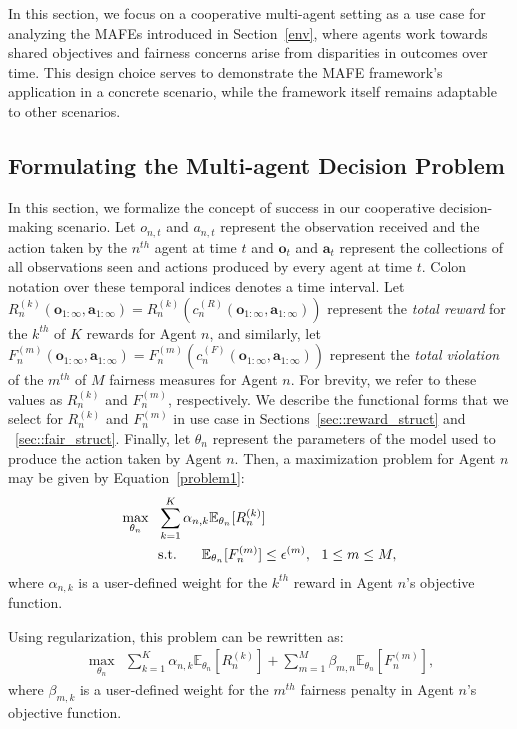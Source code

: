 \label{Fair_Sec}

In this section, we focus on a cooperative multi-agent setting as a use case for analyzing the MAFEs introduced in Section~\ref{env}, where agents work towards shared objectives and fairness concerns arise from disparities in outcomes over time. This design choice serves to demonstrate the MAFE framework’s application in a concrete scenario, while the framework itself remains adaptable to other scenarios.

\subsection{Formulating the Multi-agent Decision Problem}
In this section, we formalize the concept of success in our cooperative decision-making scenario. Let $o_{n,t}$ and $a_{n,t}$ represent the observation received and the action taken by the $n^{th}$ agent at time $t$ and $\mathbf{o}_{t}$ and $\mathbf{a}_{t}$ represent the collections of all observations seen and actions produced by every agent at time $t$. Colon notation over these temporal indices denotes a time interval. Let $R_n^{(k)}(\mathbf{o}_{1:\infty},\mathbf{a}_{1:\infty})=R^{(k)}_n(c_n^{(R)}(\mathbf{o}_{1:\infty},\mathbf{a}_{1:\infty}))$ represent the \textit{total reward} for the $k^{th}$ of $K$ rewards for Agent $n$, and similarly, let $F_n^{(m)}(\mathbf{o}_{1:\infty},\mathbf{a}_{1:\infty})=F_n^{(m)}(c_n^{(F)}(\mathbf{o}_{1:\infty},\mathbf{a}_{1:\infty}))$ represent the \textit{total violation} of the $m^{th}$ of $M$ fairness measures for Agent $n$. For brevity, we refer to these values as $R_n^{(k)}$ and $F_n^{(m)}$, respectively. We describe the functional forms that we select for $R^{(k)}_n$ and $F_n^{(m)}$ in use case in Sections~\ref{sec::reward_struct} and ~\ref{sec::fair_struct}. Finally, let $\theta_n$ represent the parameters of the model used to produce the action taken by Agent $n$. Then, a maximization problem for Agent $n$ may be given by Equation~\ref{problem1}:
\begin{align}
    \label{problem1}
     \max_{\theta_n} \ \ & \sum_{k=1}^{K}
    \alpha_{n,k}\mathbb{E}_{\theta_n}[R_n^{(k)}]\notag\\
     &\text{s.t. } \ \ \ \ \mathbb{E}_{\theta_n}[F_n^{(m)}] \leq \epsilon^{(m)}, \ \ 1\leq m \leq M,
\end{align}
where $\alpha_{n,k}$ is a user-defined weight for the $k^{th}$ reward in Agent $n$'s objective function.

Using regularization, this problem can be rewritten as:
\begin{align}
    \label{problem1_reg}
    \max_{\theta_n} \ \ \sum_{k=1}^{K}
    \alpha_{n,k}\mathbb{E}_{\theta_n}[R_n^{(k)}]+ \sum_{m=1}^{M}\beta_{m,n} \mathbb{E}_{\theta_n}[F_n^{(m)}],
\end{align}
where $\beta_{m,k}$ is a user-defined weight for the $m^{th}$ fairness penalty in Agent $n$'s objective function.

